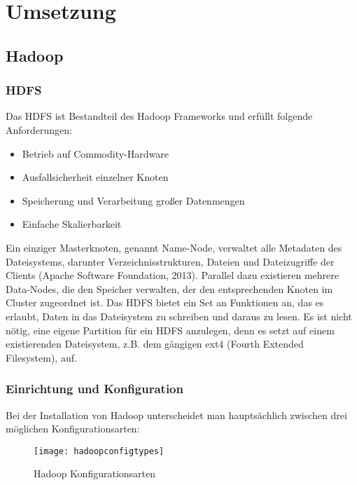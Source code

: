 \chapter{Umsetzung}
\label{cha:Umsetzung}

\section{Hadoop}
\label{sec:Hadoop}

\subsection{HDFS}
\label{hdfs}

Das HDFS ist Bestandteil des Hadoop Frameworks und erfüllt folgende Anforderungen:

\begin{itemize}
\item Betrieb auf Commodity-Hardware
\item Ausfallsicherheit einzelner Knoten
\item Speicherung und Verarbeitung großer Datenmengen
\item Einfache Skalierbarkeit
\end{itemize}

Ein einziger Masterknoten, genannt Name-Node, verwaltet alle Metadaten des Dateisystems, darunter Verzeichnisstrukturen, Dateien und Dateizugriffe der Clients (Apache Software Foundation, 2013). Parallel dazu existieren mehrere Data-Nodes, die den Speicher verwalten, der den entsprechenden Knoten im Cluster zugeordnet ist. Das HDFS bietet ein Set an Funktionen an, das es erlaubt, Daten in das Dateisystem zu schreiben und daraus zu lesen. Es ist nicht nötig, eine eigene Partition für ein HDFS anzulegen, denn es setzt auf einem existierenden Dateisystem, z.B. dem gängigen ext4 (Fourth Extended Filesystem), auf.

\pagebreak

\subsection{Einrichtung und Konfiguration}
\label{subsec:einrichtungkonfig}

Bei der Installation von Hadoop unterscheidet man hauptsächlich zwischen drei möglichen Konfigurationsarten:

\begin{figure}[!htb]
	\centering
	\texttt{[image: hadoopconfigtypes]}
	\caption{Hadoop Konfigurationsarten}
	\label{img:hadoopconfigtypes}
\end{figure}

